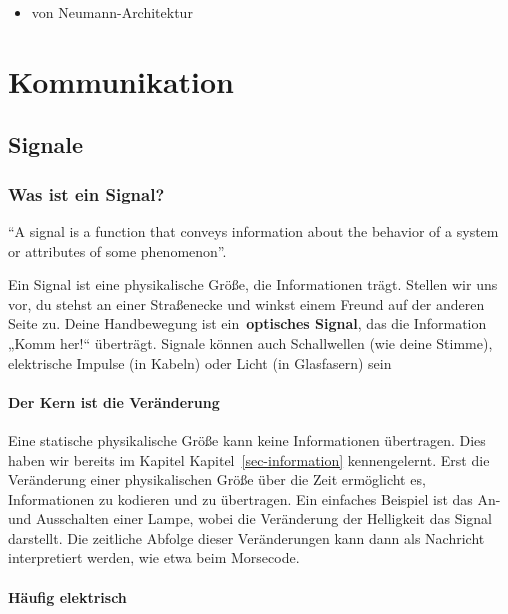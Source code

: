 \documentclass[
  letterpaper,
  DIV=11]{scrreprt}
\providecommand{\tightlist}{%
  \setlength{\itemsep}{0pt}\setlength{\parskip}{0pt}}\usepackage{longtable,booktabs,array}
\begin{document}
\begin{itemize}
\tightlist
\item
  von Neumann-Architektur
\end{itemize}

\part{Kommunikation}

\chapter{Signale}\label{signale}

\section{Was ist ein Signal?}\label{was-ist-ein-signal}

``A signal is a function that conveys information about the behavior of
a system or attributes of some phenomenon''.

Ein Signal ist eine physikalische Größe, die Informationen trägt.
Stellen wir uns vor, du stehst an einer Straßenecke und winkst einem
Freund auf der anderen Seite zu. Deine Handbewegung ist
ein~\textbf{optisches Signal}, das die Information „Komm her!{}``
überträgt. Signale können auch Schallwellen (wie deine Stimme),
elektrische Impulse (in Kabeln) oder Licht (in Glasfasern) sein

\subsection{Der Kern ist die
Veränderung}\label{der-kern-ist-die-veruxe4nderung}

Eine statische physikalische Größe kann keine Informationen übertragen.
Dies haben wir bereits im Kapitel Kapitel~\ref{sec-information}
kennengelernt. Erst die Veränderung einer physikalischen Größe über die
Zeit ermöglicht es, Informationen zu kodieren und zu übertragen. Ein
einfaches Beispiel ist das An- und Ausschalten einer Lampe, wobei die
Veränderung der Helligkeit das Signal darstellt. Die zeitliche Abfolge
dieser Veränderungen kann dann als Nachricht interpretiert werden, wie
etwa beim Morsecode.

\subsection{Häufig elektrisch}\label{huxe4ufig-elektrisch}
\end{document}
